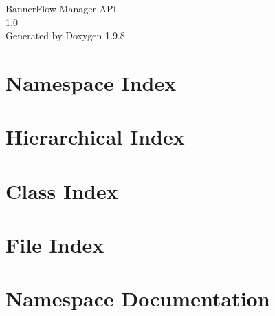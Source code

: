 \documentclass[twoside]{book}
\newcommand{\+}{\discretionary{\mbox{\scriptsize$\hookleftarrow$}}{}{}}
\newcommand{\clearemptydoublepage}{%
    \newpage{\pagestyle{empty}\cleardoublepage}%
  }
\begin{document}
  \raggedbottom
    \hypersetup{pageanchor=false,
                bookmarksnumbered=true,
                pdfencoding=unicode
               }
  \begin{titlepage}
  \vspace*{7cm}
  \begin{center}%
  {\Large Banner\+Flow Manager API}\\
  [1ex]\large 1.\+0 \\
  \vspace*{1cm}
  {\large Generated by Doxygen 1.9.8}\\
  \end{center}
  \end{titlepage}
  \clearemptydoublepage
  \tableofcontents
  \clearemptydoublepage
  \hypersetup{pageanchor=true}

\chapter{Namespace Index}

\chapter{Hierarchical Index}

\chapter{Class Index}

\chapter{File Index}

\chapter{Namespace Documentation}













\end{document}
